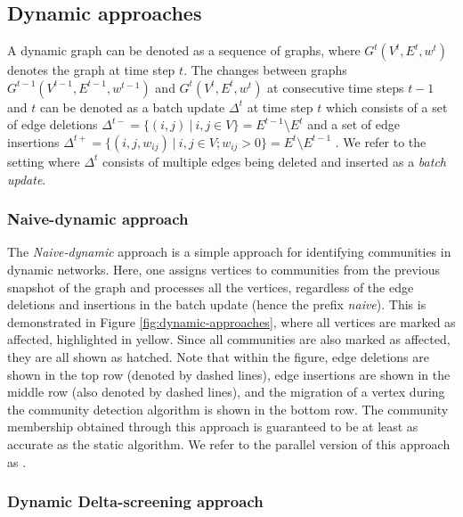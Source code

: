 \subsection{Dynamic approaches}
\label{sec:dynamic-graphs}

A dynamic graph can be denoted as a sequence of graphs, where $G^t(V^t, E^t, w^t)$ denotes the graph at time step $t$. The changes between graphs $G^{t-1}(V^{t-1}, E^{t-1}, w^{t-1})$ and $G^t(V^t, E^t, w^t)$ at consecutive time steps $t-1$ and $t$ can be denoted as a batch update $\Delta^t$ at time step $t$ which consists of a set of edge deletions $\Delta^{t-} = \{(i, j)\ |\ i, j \in V\} = E^{t-1} \setminus E^t$ and a set of edge insertions $\Delta^{t+} = \{(i, j, w_{ij})\ |\ i, j \in V; w_{ij} > 0\} = E^t \setminus E^{t-1}$ \cite{com-zarayeneh21}. We refer to the setting where $\Delta^t$ consists of multiple edges being deleted and inserted as a \textit{batch update}.


\subsubsection{Naive-dynamic approach}
\label{sec:naive-dynamic}

The \textit{Naive-dynamic} approach is a simple approach for identifying communities in dynamic networks. Here, one assigns vertices to communities from the previous snapshot of the graph and processes all the vertices, regardless of the edge deletions and insertions in the batch update (hence the prefix \textit{naive}). This is demonstrated in Figure \ref{fig:dynamic-approaches}, where all vertices are marked as affected, highlighted in yellow. Since all communities are also marked as affected, they are all shown as hatched. Note that within the figure, edge deletions are shown in the top row (denoted by dashed lines), edge insertions are shown in the middle row (also denoted by dashed lines), and the migration of a vertex during the community detection algorithm is shown in the bottom row. The community membership obtained through this approach is guaranteed to be at least as accurate as the static algorithm. We refer to the parallel version of this approach as \Nai{}.


\subsubsection{Dynamic Delta-screening approach \cite{com-zarayeneh21}}
\label{sec:delta-screening}

